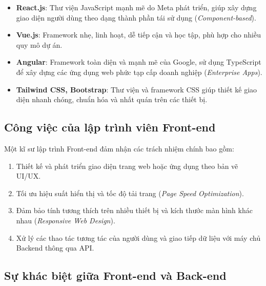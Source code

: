 \documentclass[11pt,oneside]{book}
\newcommand{\thd}[1]{\textcolor{white}{\textbf{\strut #1}}}
\newcommand{\term}[1]{\textbf{\textcolor{primaryBlue}{#1}}}
\begin{document}
\begin{itemize}[leftmargin=1.8em, itemsep=3pt, parsep=0pt]
    \item \term{React.js}: Thư viện JavaScript mạnh mẽ do Meta phát triển, giúp xây dựng giao diện người dùng theo dạng thành phần tái sử dụng (\textit{Component-based}).
    \item \term{Vue.js}: Framework nhẹ, linh hoạt, dễ tiếp cận và học tập, phù hợp cho nhiều quy mô dự án.
    \item \term{Angular}: Framework toàn diện và mạnh mẽ của Google, sử dụng TypeScript để xây dựng các ứng dụng web phức tạp cấp doanh nghiệp (\textit{Enterprise Apps}).
    \item \term{Tailwind CSS, Bootstrap}: Thư viện và framework CSS giúp thiết kế giao diện nhanh chóng, chuẩn hóa và nhất quán trên các thiết bị.
\end{itemize}

\subsection{Công việc của lập trình viên Front-end}

Một kĩ sư lập trình Front-end đảm nhận các trách nhiệm chính bao gồm:
\begin{enumerate}[label=\textbf{\color{primaryBlue}\arabic*.}, leftmargin=2em, itemsep=3pt, parsep=0pt, topsep=2pt]
    \item Thiết kế và phát triển giao diện trang web hoặc ứng dụng theo bản vẽ UI/UX.
    \item Tối ưu hiệu suất hiển thị và tốc độ tải trang (\textit{Page Speed Optimization}).
    \item Đảm bảo tính tương thích trên nhiều thiết bị và kích thước màn hình khác nhau (\textit{Responsive Web Design}).
    \item Xử lý các thao tác tương tác của người dùng và giao tiếp dữ liệu với máy chủ Backend thông qua API.
\end{enumerate}

\subsection{Sự khác biệt giữa Front-end và Back-end}

\begin{prettyTableBox}
\end{prettyTableBox}
\end{document}

